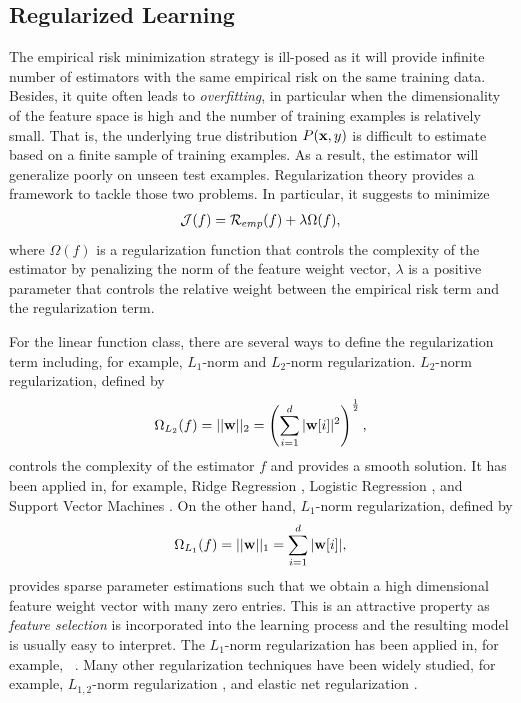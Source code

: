 \subsection{Regularized Learning}\label{sc_rl}

The empirical risk minimization strategy is ill-posed as it will provide infinite number of estimators with the same empirical risk on the same training data.
Besides, it quite often leads to \textit{overfitting}, in particular when the dimensionality of the feature space is high and the number of training examples is relatively small.
That is, the underlying true distribution $P(\mathbf {x},y)$ is difficult to estimate based on a finite sample of training examples.
As a result, the estimator will generalize poorly on unseen test examples.
Regularization theory \citep{Evgeniou99a,Evgeniou02regularization} provides a framework to tackle those two problems.
In particular, it suggests to minimize 
 \begin{align}
	\mathcal{J}(f) = \mathcal{R}_{emp}(f) + \lambda\Omega(f), \label{rl}
\end{align}
where $\Omega(f)$ is a regularization function that controls the complexity of the estimator by penalizing the norm of the feature weight vector, $\lambda$ is a positive parameter that controls the relative weight between the empirical risk term and the regularization term.

For the linear function class, there are several ways to define the regularization term including, for example, $L_1$-norm and $L_2$-norm regularization.
$L_2$-norm regularization, defined by 
\begin{align}
	\Omega_{L_2}(f) = ||\mathbf {w}||_2=\left(\sum_{i=1}^d|\mathbf {w}[i]|^2\right)^{\frac{1}{2}}, \label{l2_norm}
\end{align} 
controls the complexity of the estimator $f$ and provides a smooth solution.
It has been applied in, for example, Ridge Regression \citep{Hoerl00ridge}, Logistic Regression \citep{Chen00}, and Support Vector Machines \citep{Cortes95support}.
On the other hand, $L_1$-norm regularization, defined by
\begin{align*}
	\Omega_{L_1}(f) = ||\mathbf {w}||_1=\sum_{i=1}^d|\mathbf {w}[i]|,
\end{align*}
provides sparse parameter estimations such that we obtain a high dimensional feature weight vector with many zero entries.
This is an attractive property as \textit{feature selection} is incorporated into the learning process and the resulting model is usually easy to interpret.
The $L_1$-norm regularization has been applied in, for example, \lasso\ \citep{Tibshirani94regression}.
Many other regularization techniques have been widely studied, for example, $L_{1,2}$-norm regularization \citep{Argyriou07multitask}, and elastic net regularization \citep{Zou05regularizationa}.


